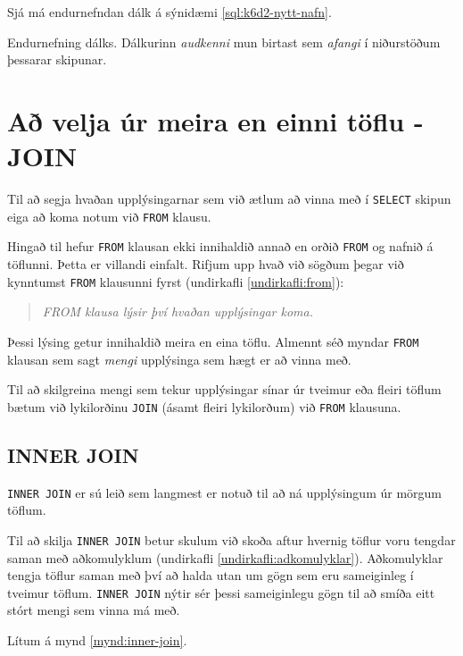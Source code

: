 Sjá má endurnefndan dálk á sýnidæmi \ref{sql:k6d2-nytt-nafn}.

\begin{example}
\caption[Endurnefning]{Endurnefning dálks. Dálkurinn \emph{audkenni} mun birtast sem \emph{afangi} í niðurstöðum þessarar skipunar.}
\label{sql:k6d2-nytt-nafn}
\centering
{}
\end{example}

\section{Að velja úr meira en einni töflu - JOIN}
Til að segja hvaðan upplýsingarnar sem við ætlum að vinna með í \verb|SELECT| skipun eiga að koma notum við \verb|FROM| klausu.

Hingað til hefur \verb|FROM| klausan ekki innihaldið annað en orðið \verb|FROM| og nafnið á töflunni. Þetta er villandi einfalt. Rifjum upp hvað við sögðum þegar við kynntumst \verb|FROM| klausunni fyrst (undirkafli \ref{undirkafli:from}):
\begin{quote}
\emph{FROM klausa lýsir því hvaðan upplýsingar koma.}
\end{quote}
Þessi lýsing getur innihaldið meira en eina töflu. Almennt séð myndar \verb|FROM| klausan sem sagt \emph{mengi} upplýsinga sem hægt er að vinna með.

Til að skilgreina mengi sem tekur upplýsingar sínar úr tveimur eða fleiri töflum bætum við lykilorðinu \verb|JOIN| (ásamt fleiri lykilorðum) við \verb|FROM| klausuna.

\subsection{INNER JOIN}
\verb|INNER JOIN| er sú leið sem langmest er notuð til að ná upplýsingum úr mörgum töflum. 

Til að skilja \verb|INNER JOIN| betur skulum við skoða aftur hvernig töflur voru tengdar saman með aðkomulyklum (undirkafli \ref{undirkafli:adkomulyklar}).
Aðkomulyklar tengja töflur saman með því að halda utan um gögn sem eru sameiginleg í tveimur töflum. \verb|INNER JOIN| nýtir sér þessi sameiginlegu gögn til að smíða eitt stórt mengi sem vinna má með.

Lítum á mynd \ref{mynd:inner-join}.

